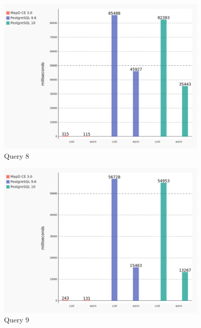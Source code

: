 \begin{figure}[H]
    \centering
    \includegraphics[width=0.9\textwidth,keepaspectratio]{charts/query_8.png}
    \caption{Query 8}
    \label{fig:query_8}
\end{figure}

\begin{figure}[H]
    \centering
    \includegraphics[width=0.9\textwidth,keepaspectratio]{charts/query_9.png}
    \caption{Query 9}
    \label{fig:query_9}
\end{figure}

